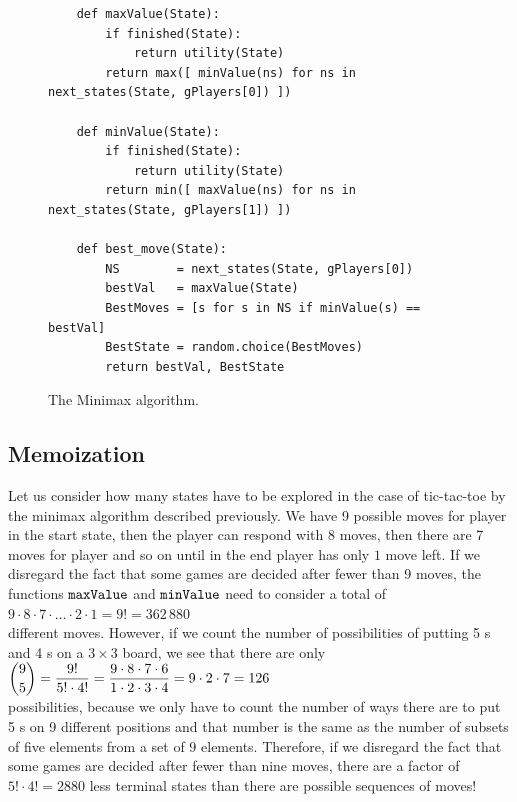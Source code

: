 \begin{figure}[!ht]
\centering
\begin{verbatim}
    def maxValue(State):
        if finished(State):
            return utility(State)
        return max([ minValue(ns) for ns in next_states(State, gPlayers[0]) ])
    
    def minValue(State):  
        if finished(State):
            return utility(State)
        return min([ maxValue(ns) for ns in next_states(State, gPlayers[1]) ])
    
    def best_move(State):
        NS        = next_states(State, gPlayers[0])
        bestVal   = maxValue(State)
        BestMoves = [s for s in NS if minValue(s) == bestVal]
        BestState = random.choice(BestMoves)
        return bestVal, BestState
\end{verbatim}
\caption{The Minimax algorithm.}
\label{fig:Minimax.ipynb}
\end{figure}
\FloatBarrier

\subsection{Memoization}
Let us consider how many states have to be explored in the case of tic-tac-toe by the minimax algorithm
described previously.  We have 9 possible moves for player  in the start state, then the player
 can respond with 8 moves, then there are 7 moves for player  and so on until in the end
player  has only $1$ move left.  If we disregard 
the fact that some games are decided after fewer than 9 moves, the functions $\texttt{maxValue}$ and
$\texttt{minValue}$ need to consider  a total of
\\[0.2cm]
\hspace*{1.3cm}
$9 \cdot 8 \cdot 7 \cdot {\dots} \cdot 2 \cdot 1 = 9! = 362\,880$
\\[0.2cm]
different moves.  However, if we count the number of possibilities of putting 5 s and 4
s on a $3 \times 3$ board, we see that there are only
\\[0.2cm]
\hspace*{1.3cm}
$\displaystyle {9 \choose 5} = \frac{9!}{5! \cdot 4!} = \frac{9 \cdot 8 \cdot 7 \cdot 6}{1 \cdot 2 \cdot 3 \cdot 4} = 9 \cdot 2 \cdot 7 =  126$
\\[0.2cm]
possibilities, because we only have to count the number of ways there are to put 5 s on
9 different positions and that number is the same as the number of subsets of five
elements from a set of 9 elements. 
Therefore, if we disregard the fact that some games are decided after fewer than nine moves,  there are a
factor of $5! \cdot 4! = 2880$ less terminal states than there are possible sequences of moves!

